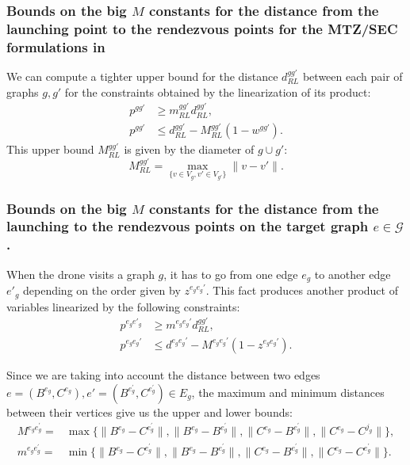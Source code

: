 \subsubsection*{Bounds on the big $M$ constants for the distance from the launching point to the rendezvous points for the MTZ/SEC formulations in \AMD}

We can compute a tighter upper bound for the distance $d_{RL}^{gg'}$ between each pair of graphs $g,g'$ for the constraints obtained by the linearization of its product:
\begin{align*}
p^{gg'} & \geq m_{RL}^{gg'} d_{RL}^{gg'}, \\
p^{gg'} & \leq d_{RL}^{gg'} - M_{RL}^{gg'}(1-w^{gg'}).
\end{align*}
This upper bound $M_{RL}^{gg'}$ is given by the diameter of $g\cup g'$:
$$
M_{RL}^{gg'} = \max_{\{v\in V_g, v'\in V_{g'}\}}\|v - v'\|.
$$


\subsubsection*{Bounds on the big $M$ constants for the distance from the launching to the rendezvous points on the target graph $e\in \mathcal{G}$.} When the drone visits a graph $g$, it has to go from one edge $e_g$ to another edge $e'_g$ depending on the order given by $z^{e_ge_g'}$. This fact produces another product of variables linearized by the following constraints:
\begin{align*}
p^{e_ge'_g} & \geq m^{e_ge_g'} d_{RL}^{gg'}, \\
p^{e_ge_g'} & \leq d^{e_ge_g'} - M^{e_ge_g'}(1-z^{e_ge_g'}).
\end{align*}

\noindent
Since we are taking into account the distance between two edges $e=(B^{e_g},C^{e_g}) , e'=(B^{e^\prime_g},C^{e^\prime_g})\in E_g$, the maximum and minimum distances between their vertices give us the upper and lower bounds:
\begin{align*}
M^{e_g e^\prime_g} = & \max\{\|B^{e_g} - C^{e^\prime_g}\|, \|B^{e_g} - B^{e^\prime_g}\|, \|C^{e_g} - B^{e^\prime_g}\|, \|C^{e_g} - C^{j_g}\|\}, \\
m^{e_g e^\prime_g} = & \min\{\|B^{e_g} - C^{e^\prime_g}\|, \|B^{e_g} - B^{e^\prime_g}\|, \|C^{e_g} - B^{e^\prime_g}\|, \|C^{e_g} - C^{e^\prime_g}\|\}.
\end{align*}

